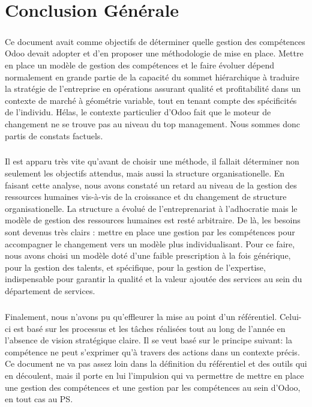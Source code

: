 \chapter*{Conclusion Générale}
\paragraph{}Ce document avait comme objectifs de déterminer quelle gestion des compétences Odoo devait adopter et d'en proposer une méthodologie de mise en place. Mettre en place un modèle de gestion des compétences et le faire évoluer dépend normalement en grande partie de la capacité du sommet hiérarchique à traduire la stratégie de l’entreprise en opérations assurant qualité et profitabilité dans un contexte de marché à géométrie variable, tout en tenant compte des spécificités de l’individu. Hélas, le contexte particulier d'Odoo fait que le moteur de changement ne se trouve pas au niveau du top management. Nous sommes donc partis de constats factuels. 

\paragraph{}Il est apparu très vite qu'avant de choisir une méthode, il fallait déterminer non seulement les objectifs attendus, mais aussi la structure organisationelle. En faisant cette analyse, nous avons constaté un retard au niveau de la gestion des ressources humaines vis-à-vis de la croissance et du changement de structure organisationelle. La structure a évolué de l'entreprenariat à l'adhocratie mais le modèle de gestion des ressources humaines est resté arbitraire. De là, les besoins sont devenus très clairs : mettre en place une gestion par les compétences pour accompagner le changement vers un modèle plus individualisant. Pour ce faire, nous avons choisi un modèle doté d'une faible prescription à la fois générique, pour la gestion des talents, et spécifique, pour la gestion de l'expertise, indispensable pour garantir la qualité et la valeur ajoutée des services au sein du département de services.

\paragraph{} Finalement, nous n'avons pu qu'effleurer la mise au point d'un référentiel. Celui-ci est basé sur les processus et les tâches réalisées tout au long de l'année en l'absence de vision stratégique claire. Il se veut basé sur le principe suivant: la compétence ne peut s'exprimer qu'à travers des actions dans un contexte précis. Ce document ne va pas assez loin dans la définition du référentiel et des outils qui en découlent, mais il porte en lui l'impulsion qui va permettre de mettre en place une gestion des compétences et une gestion par les compétences au sein d'Odoo, en tout cas au PS. 



